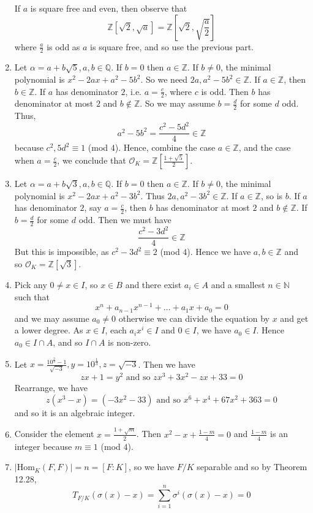 \begin{enumerate}
    If $a$ is square free and even, then observe that
    $$\mathbb{Z}[\sqrt{2},\sqrt{a}]=\mathbb{Z}\left[\sqrt{2},\sqrt{\frac{a}{2}}\right]$$
    where $\frac{a}{2}$ is odd as $a$ is square free, and so use the previous part.\\
\item Let $\alpha=a+b\sqrt{5}, a,b \in \mathbb{Q}$. If $b=0$ then $a \in \mathbb{Z}$. If $b \neq 0$, the minimal polynomial is $x^2-2ax+a^2-5b^2$. So we need
    $2a,a^2-5b^2 \in \mathbb{Z}$. If $a \in \mathbb{Z}$, then $b \in \mathbb{Z}$.
    If $a$ has denominator $2$, i.e. $a=\frac{c}{2}$, where $c$ is odd. Then $b$ has denominator at most $2$ and $b \not \in \mathbb{Z}$. So we may assume $b=\frac{d}{2}$ for some $d$ odd. Thus,
    $$a^2-5b^2=\frac{c^2-5d^2}{4} \in \mathbb{Z}$$ because
    $c^2,5d^2 \equiv 1$ (mod $4$). Hence, combine the case $a \in \mathbb{Z}$, and the case when $a=\frac{c}{2}$, we conclude that $\mathcal{O}_K=\mathbb{Z}[\frac{1+\sqrt{5}}{2}]$.\\
\item Let $\alpha=a+b\sqrt{3}, a,b \in \mathbb{Q}$. If $b=0$ then $a \in \mathbb{Z}$. If $b \neq 0$, the minimal polynomial is $x^2-2ax+a^2-3b^2$. Thus $2a,a^2-3b^2 \in \mathbb{Z}$. If $a \in \mathbb{Z}$, so is $b$.
    If $a$ has denominator $2$, say $a=\frac{c}{2}$, then $b$ has denominator at most $2$ and $b \not \in \mathbb{Z}$. If $b=\frac{d}{2}$ for some $d$ odd. Then we must have
    $$\frac{c^2-3d^2}{4} \in \mathbb{Z}$$
    But this is impossible, as $c^2-3d^2 \equiv 2$ (mod $4$). Hence we have $a,b \in \mathbb{Z}$ and so
    $\mathcal{O}_K=\mathbb{Z}[\sqrt{3}]$.\\
\item Pick any $0 \neq x \in I$, so $x \in B$ and there exist $a_i \in A$ and a smallest $n \in \mathbb{N}$ such that
    $$x^n+a_{n-1}x^{n-1}+\ldots+a_1 x+a_0=0$$
    and we may assume $a_0 \neq 0$ otherwise we can divide the equation by $x$ and get a lower degree.
    As $x \in I$, each $a_i x^i \in I$ and $0 \in I$, we have $a_0 \in I$. Hence $a_0 \in I \cap A$, and so $I \cap A$ is non-zero.\\
\item Let $x=\frac{10^{\frac{2}{3}}-1}{\sqrt{-3}}, y=10^{\frac{1}{3}}, z= \sqrt{-3}$. Then we have
    $$zx+1=y^2 \text{ and so } zx^3+3x^2-zx+33=0$$
    Rearrange, we have
    $$z(x^3-x)=(-3x^2-33) \text{ and so } x^6+x^4+67x^2+363=0$$ and so it is an algebraic integer.
\item Consider the element $x=\frac{1+\sqrt{m}}{2}$. Then $x^2-x+\frac{1-m}{4}=0$ and $\frac{1-m}{4}$ is an integer because $m \equiv 1$ (mod $4$).\\
\item $|\text{Hom}_K(F,F)|=n=[F:K]$, so we have $F/K$ separable and so by Theorem 12.28,
    $$T_{F/K}\left(\sigma(x)-x\right)=\sum_{i=1}^n \sigma^i\left(\sigma(x)-x \right)=0$$


\end{enumerate}
